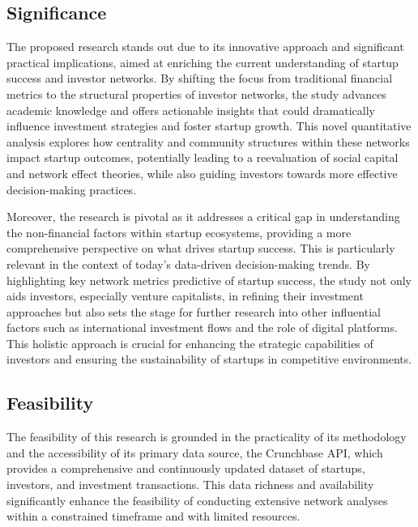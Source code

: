 \documentclass[a4paper,11pt]{article}
\begin{document}
\subsection{Significance}

The proposed research stands out due to its innovative approach and significant practical implications, aimed at enriching the current understanding of startup success and investor networks. By shifting the focus from traditional financial metrics to the structural properties of investor networks, the study advances academic knowledge and offers actionable insights that could dramatically influence investment strategies and foster startup growth. This novel quantitative analysis explores how centrality and community structures within these networks impact startup outcomes, potentially leading to a reevaluation of social capital and network effect theories, while also guiding investors towards more effective decision-making practices.

Moreover, the research is pivotal as it addresses a critical gap in understanding the non-financial factors within startup ecosystems, providing a more comprehensive perspective on what drives startup success. This is particularly relevant in the context of today's data-driven decision-making trends. By highlighting key network metrics predictive of startup success, the study not only aids investors, especially venture capitalists, in refining their investment approaches but also sets the stage for further research into other influential factors such as international investment flows and the role of digital platforms. This holistic approach is crucial for enhancing the strategic capabilities of investors and ensuring the sustainability of startups in competitive environments.

\subsection{Feasibility}

The feasibility of this research is grounded in the practicality of its methodology and the accessibility of its primary data source, the Crunchbase API, which provides a comprehensive and continuously updated dataset of startups, investors, and investment transactions. This data richness and availability significantly enhance the feasibility of conducting extensive network analyses within a constrained timeframe and with limited resources.
\end{document}
